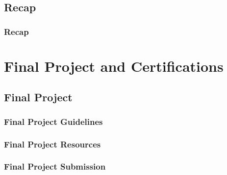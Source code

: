 \documentclass[a4paper, oneside]{book}
\begin{document}
\section{Recap}
\subsection{Recap}


\chapter{Final Project and Certifications}

\section{Final Project}
\subsection{Final Project Guidelines}
\subsection{Final Project Resources}
\subsection{Final Project Submission}
\end{document}
